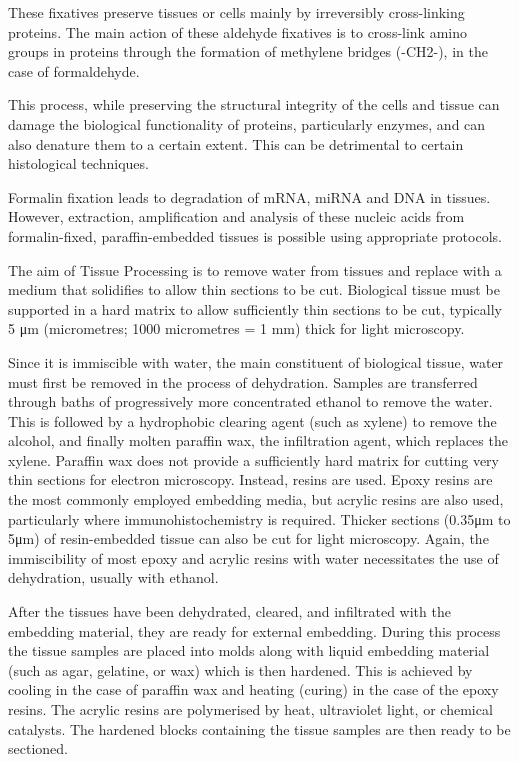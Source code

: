 These fixatives preserve tissues or cells mainly by irreversibly cross-linking
proteins. The main action of these aldehyde fixatives is to cross-link amino
groups in proteins through the formation of methylene bridges (-CH2-), in the
case of formaldehyde.

This process, while preserving the structural integrity of the cells and tissue
can damage the biological functionality of proteins, particularly enzymes, and
can also denature them to a certain extent. This can be detrimental to certain
histological techniques.

Formalin fixation leads to degradation of mRNA, miRNA and DNA in tissues.
However, extraction, amplification and analysis of these nucleic acids from
formalin-fixed, paraffin-embedded tissues is possible using appropriate
protocols.

The aim of Tissue Processing is to remove water from tissues and replace with a
medium that solidifies to allow thin sections to be cut. Biological tissue must
be supported in a hard matrix to allow sufficiently thin sections to be cut,
typically 5 μm (micrometres; 1000 micrometres = 1 mm) thick for light microscopy.

Since it is immiscible with water, the main constituent of biological tissue,
water must first be removed in the process of dehydration. Samples are
transferred through baths of progressively more concentrated ethanol to remove
the water. This is followed by a hydrophobic clearing agent (such as xylene) to
remove the alcohol, and finally molten paraffin wax, the infiltration agent,
which replaces the xylene. Paraffin wax does not provide a sufficiently hard
matrix for cutting very thin sections for electron microscopy. Instead, resins
are used. Epoxy resins are the most commonly employed embedding media, but
acrylic resins are also used, particularly where immunohistochemistry is
required. Thicker sections (0.35μm to 5μm) of resin-embedded tissue can also be
cut for light microscopy. Again, the immiscibility of most epoxy and acrylic
resins with water necessitates the use of dehydration, usually with ethanol.

After the tissues have been dehydrated, cleared, and infiltrated with the
embedding material, they are ready for external embedding. During this process
the tissue samples are placed into molds along with liquid embedding material
(such as agar, gelatine, or wax) which is then hardened. This is achieved by
cooling in the case of paraffin wax and heating (curing) in the case of the
epoxy resins. The acrylic resins are polymerised by heat, ultraviolet light, or
chemical catalysts. The hardened blocks containing the tissue samples are then
ready to be sectioned.

